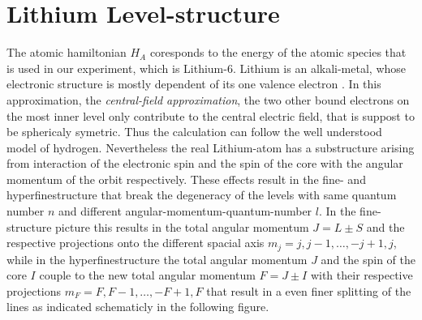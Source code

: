 \section{Lithium Level-structure}
The atomic hamiltonian $H_A$ coresponds to the energy of the atomic species that is used in our experiment, which is Lithium-6. Lithium is an alkali-metal, whose electronic structure is mostly dependent of its one valence electron \cite{gehm}. In this approximation, the \textit{central-field approximation}, the two other bound electrons on the most inner level only contribute to the central electric field, that is suppost to be sphericaly symetric. Thus the calculation can follow the well understood model of hydrogen. Nevertheless the real Lithium-atom has a substructure arising from interaction of the electronic spin and the spin of the core with the angular momentum of the orbit respectively. These effects result in the fine- and hyperfinestructure that break the degeneracy of the levels with same quantum number $n$ and different angular-momentum-quantum-number $l$. In the fine-structure picture this results in the total angular momentum $J=L\pm S$ and the respective projections onto the different spacial axis $m_j=j,j-1,\dots,-j+1,j$, while in the hyperfinestructure the total angular momentum $J$ and the spin of the core $I$ couple to the new total angular momentum $F=J\pm I$ with their respective projections $m_F=F,F-1,\dots,-F+1,F$ that result in a even finer splitting of the lines as indicated schematicly in the following figure.


